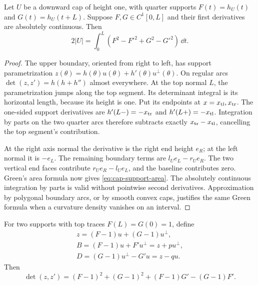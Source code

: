 \begin{lemma}\label{lem:cap-support-area}
Let $U$ be a downward cap of height one, with quarter supports
$F(t)=h_U(t)$ and $G(t)=h_U(t+L)$. Suppose $F,G\in C^1[0,L]$
and their first derivatives are absolutely continuous. Then
\begin{equation}\label{eq:cap-support-area}
 2|U|=\int_0^L(F^2-F'^2+G^2-G'^2)\,\dd t.
\end{equation}
\end{lemma}
\begin{proof}
The upper boundary, oriented from right to left, has support
parametrization $z(\theta)=h(\theta)u(\theta)+h'(\theta)u^\perp(\theta)$.
On regular arcs
$\det(z,z')=h(h+h'')$ almost everywhere.
At the top normal $L$, the parametrization jumps along the top
segment. Its determinant integral is its horizontal length, because
its height is one. Put its endpoints at $x=x_{\rm tl},x_{\rm tr}$.
The one-sided support derivatives are
$h'(L-)=-x_{\rm tr}$ and $h'(L+)=-x_{\rm tl}$.
Integration by parts on the two quarter arcs therefore subtracts
exactly $x_{\rm tr}-x_{\rm tl}$, cancelling the top segment's
contribution.

At the right axis normal the derivative is the right end height
$e_R$; at the left normal it is $-e_L$. The remaining boundary
terms are $l_Ue_L-r_Ue_R$. The two vertical end faces contribute
$r_Ue_R-l_Ue_L$, and the baseline contributes zero.
Green's area formula now gives \cref{eq:cap-support-area}.
The absolutely continuous integration by parts is valid without
pointwise second derivatives. Approximation by polygonal boundary
arcs, or by smooth convex caps, justifies the same Green formula
when a curvature density vanishes on an interval.
\end{proof}
For two supports with top traces $F(L)=G(0)=1$, define
\[
 \begin{gathered}
 z=(F-1)u+(G-1)u^\perp,\\
 B=(F-1)u+F'u^\perp=z+pu^\perp,\\
 D=(G-1)u^\perp-G'u=z-qu.
 \end{gathered}
\]
Then
\begin{equation}\label{eq:corner-determinant}
 \det(z,z')=(F-1)^2+(G-1)^2+(F-1)G'-(G-1)F'.
\end{equation}

